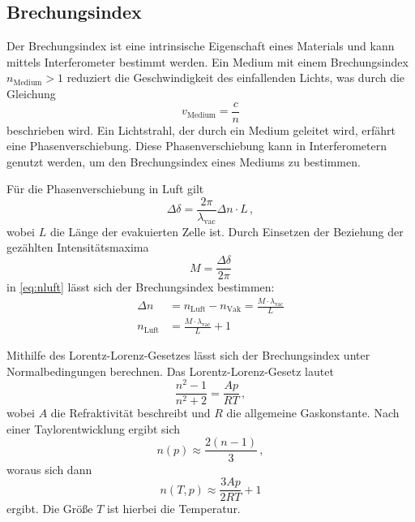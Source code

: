 \subsection{Brechungsindex} \label{sec:n}

Der Brechungsindex ist eine intrinsische Eigenschaft eines Materials und kann mittels Interferometer bestimmt werden. Ein Medium mit einem Brechungsindex $n_\text{Medium} > 1$ reduziert die Geschwindigkeit des einfallenden Lichts, was durch die Gleichung
\begin{equation*}
    v_\text{Medium} = \frac{c}{n}
\end{equation*}
beschrieben wird. Ein Lichtstrahl, der durch ein Medium geleitet wird, erfährt eine Phasenverschiebung. Diese Phasenverschiebung kann in Interferometern genutzt werden, um den Brechungsindex eines Mediums zu bestimmen.

Für die Phasenverschiebung in Luft gilt
\begin{equation} \label{eq:nluft}
    \Delta \delta = \frac{2 \pi}{\lambda_\text{vac}} \Delta n \cdot L \, ,
\end{equation}
wobei $L$ die Länge der evakuierten Zelle ist. Durch Einsetzen der Beziehung der gezählten Intensitätsmaxima 
\begin{equation} \label{eq:maxima}
    M = \frac{\Delta \delta}{2 \pi}
\end{equation}
in \autoref{eq:nluft} lässt sich der Brechungsindex bestimmen:
\begin{align} \label{eq:nluft2}
    \Delta n &= n_\text{Luft} - n_\text{Vak} = \frac{M \cdot \lambda_\text{vac}}{L} \nonumber \\
    n_\text{Luft} &= \frac{M \cdot \lambda_\text{vac}}{L} + 1
\end{align}

Mithilfe des Lorentz-Lorenz-Gesetzes lässt sich der Brechungsindex unter Normalbedingungen berechnen. Das Lorentz-Lorenz-Gesetz lautet
\begin{equation*}
    \frac{n^2 - 1}{n^2 + 2} = \frac{A p}{R T} \, ,
\end{equation*}
wobei $A$ die Refraktivität beschreibt und $R$ die allgemeine Gaskonstante. Nach einer Taylorentwicklung ergibt sich
\begin{equation*}
    n(p) \approx \frac{2 (n-1)}{3} \, ,
\end{equation*} 
woraus sich dann
\begin{equation} \label{eq:lorentz}
    n (T,p) \approx \frac{3 A p}{ 2 R T} + 1
\end{equation}
ergibt. Die Größe $T$ ist hierbei die Temperatur.

